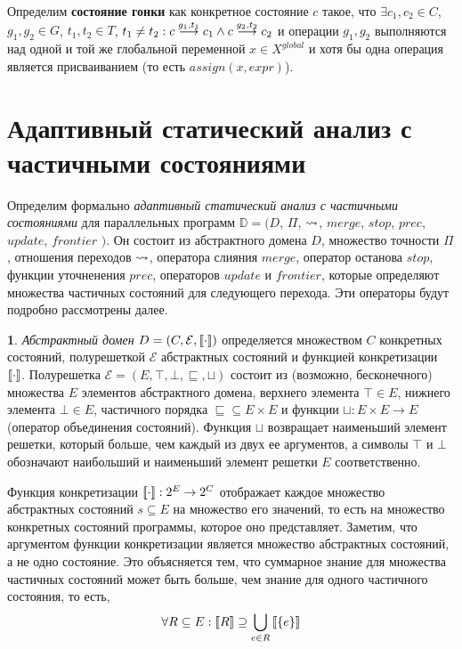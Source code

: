 \begin{defn}
\label{raceDef}
Определим \textbf{состояние гонки} как конкретное состояние $c$ такое, что $\exists c_1, c_2 \in C$, $g_1, g_2 \in G$, $t_1, t_2 \in T$, $t_1 \neq t_2 : c \stackrel{g_1, t_1}{\longrightarrow} c_1 \land c \stackrel{g_2, t_2}{\longrightarrow} c_2$ и операции $g_1, g_2$ выполняются над одной и той же глобальной переменной $x \in X^{global}$ и хотя бы одна операция является присваиванием (то есть $assign(x, expr)$).
\end{defn}



\section{Адаптивный статический анализ с частичными состояниями}
\label{sect_cpata}

\newcommand{\update}{update}
\newcommand{\frontier}{frontier}

Определим формально \emph{адаптивный статический анализ с частичными состояниями} для параллельных программ $\mathbb{D}=(D$, $\Pi$, $\leadsto$, $merge$, $stop$, $prec$, $\update$, $\frontier$ $)$.
Он состоит из абстрактного домена $D$, 
множество точности $\Pi$, 
отношения переходов $\leadsto$,
оператора слияния $merge$, оператор останова $stop$, функции уточненения $prec$, 
операторов $\update$ и $\frontier$, которые определяют множества частичных состояний для следующего перехода.
Эти операторы будут подробно рассмотрены далее.

{\textbf 1.} \emph{Абстрактный домен}  $D=(C, \mathcal{E},[\![ \cdot ]\!])$ определяется множеством $C$ конкретных состояний, полурешеткой $\mathcal{E}$ абстрактных состояний и функцией конкретизации $[\![ \cdot ]\!]$.
Полурешетка 
$\mathcal{E}=(E, \top, \bot, \sqsubseteq, \sqcup)$ состоит из (возможно, бесконечного) множества $E$ элементов абстрактного домена, верхнего элемента $\top \in E$, нижнего элемента $\bot \in E$, частичного порядка $\sqsubseteq \subseteq E \times E$ и функции $\sqcup:E \times E \rightarrow E$ (оператор объединения состояний).
Функция $\sqcup$ возвращает наименьший элемент решетки, который больше, чем каждый из двух ее аргументов, а символы $\top$ и $\bot$ обозначают наибольший и наименьший элемент решетки $E$ соответственно. 

Функция конкретизации $[\![ \cdot ]\!]: 2^E \rightarrow 2^C$ отображает каждое множество абстрактных состояний $s \subseteq E$ на множество его значений, то есть на множество конкретных состояний программы, которое оно представляет.
Заметим, что аргументом функции конкретизации является множество абстрактных состояний, а не одно состояние.
Это объясняется тем, что суммарное знание для множества частичных состояний может быть больше, чем знание для одного частичного состояния, то есть,  
$$\forall R\subseteq E: [\![ R ]\!] \supseteq \bigcup_{e\in R}{[\![ \{e\} ]\!]}$$

